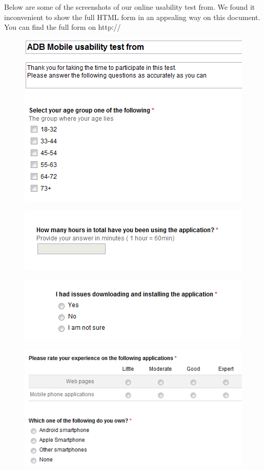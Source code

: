Below are some of the screenshots of our online usability test from. We found it inconvenient to show the full HTML form in an appealing way on this document.
You can find the full form on http://


\begin{figure}[htb]
    \centering
    \includegraphics[width=1.0\textwidth]{ut_pic/1.png}
    \label{label: Usability test form item 1}
\end{figure}
\newpage
\begin{figure}[htb]
    \centering
    \includegraphics[width=1.0\textwidth]{ut_pic/4.png}
    \label{label: Usability test form item 1}
\end{figure}

\begin{figure}[htb]
    \centering
    \includegraphics[width=1.0\textwidth]{ut_pic/3.png}
    \label{label: Usability test form item 1}
\end{figure}

\begin{figure}[htb]
    \centering
    \includegraphics[width=1.0\textwidth]{ut_pic/2.png}
    \label{label: Usability test form item 1}
\end{figure}
\newpage 